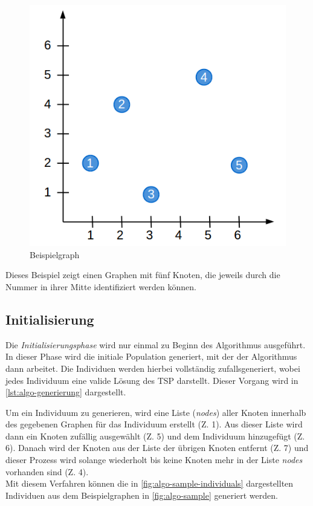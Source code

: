 \documentclass[12pt,a4paper]{scrreprt}
\newcommand{\includecode}[3]{}
\newcommand{\absatz}{\\[12pt]}
\begin{document}
\begin{figure}[ht]
  	\centering
	\includegraphics[width=400pt]{images/algo_01_sample.png}
	\caption{Beispielgraph}
	\label{fig:algo-sample}
\end{figure}

Dieses Beispiel zeigt einen Graphen mit fünf Knoten, die jeweils durch die Nummer in ihrer Mitte identifiziert werden können.

\subsection{Initialisierung}
\label{subsec:initialisation}

Die \textit{Initialisierungsphase} wird nur einmal zu Beginn des Algorithmus ausgeführt. In dieser Phase wird die initiale Population generiert, mit der der Algorithmus dann arbeitet. Die Individuen werden hierbei vollständig zufallsgeneriert, wobei jedes Individuum eine valide Lösung des TSP darstellt. Dieser Vorgang wird in \autoref{lst:algo-generierung} dargestellt.

\includecode{lst:algo-generierung}{Generierung eines Individuums}{code/algo_01_generierung.txt}

Um ein Individuum zu generieren, wird eine Liste (\textit{nodes}) aller Knoten innerhalb des gegebenen Graphen für das Individuum erstellt (Z. 1). Aus dieser Liste wird dann ein Knoten zufällig ausgewählt (Z. 5) und dem Individuum hinzugefügt (Z. 6). Danach wird der Knoten aus der Liste der übrigen Knoten entfernt (Z. 7) und dieser Prozess wird solange wiederholt bis keine Knoten mehr in der Liste \textit{nodes} vorhanden sind (Z. 4).\absatz
Mit diesem Verfahren können die in \autoref{fig:algo-sample-individuals} dargestellten Individuen aus dem Beispielgraphen in \autoref{fig:algo-sample} generiert werden.
\end{document}
